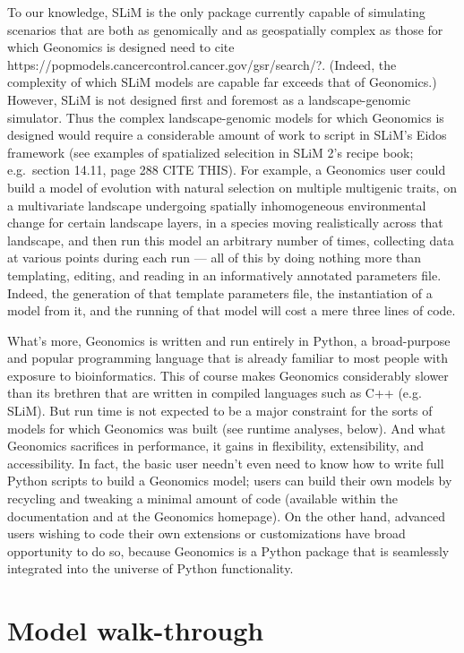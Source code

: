 ﻿\documentclass{article}
\begin{document}
To our knowledge, SLiM is the only package currently capable of simulating scenarios
that are both as genomically and as geospatially complex as those for which Geonomics is designed
{\large need to cite https://popmodels.cancercontrol.cancer.gov/gsr/search/?}.
(Indeed, the complexity of which SLiM models are capable far exceeds that of Geonomics.)
However, SLiM is not designed first and foremost as a landscape-genomic simulator.
Thus the complex landscape-genomic models for which Geonomics is designed would require
a considerable amount of work to script in SLiM's Eidos framework
(see examples of spatialized selecition in SLiM 2's recipe book;
e.g.\ section 14.11, page 288 {\large CITE THIS}).
For example, a Geonomics user could build a model of evolution with natural selection
on multiple multigenic traits, on a multivariate landscape undergoing spatially inhomogeneous
environmental change for certain landscape layers, in a species moving realistically across that landscape,
and then run this model an arbitrary number of times, collecting data at various points during each
run --- all of this by doing nothing more than templating, editing,
and reading in an informatively annotated parameters file.
Indeed, the generation of that template parameters file, the instantiation of a model from it,
and the running of that model will cost a mere three lines of code.

What's more, Geonomics is written and run entirely in Python, a broad-purpose and popular
programming language that is already familiar to most people with exposure to bioinformatics.
This of course makes Geonomics considerably slower than its brethren that are
written in compiled languages such as C++ (e.g. SLiM). 
But run time is not expected to be a major constraint for the sorts of models
for which Geonomics was built (see runtime analyses, below). 
And what Geonomics sacrifices in performance, it gains in flexibility, extensibility, and accessibility.
In fact, the basic user needn't even need to know how to write full Python scripts to 
build a Geonomics model; users can build their own models by recycling and tweaking
a minimal amount of code (available within the documentation and at the Geonomics homepage).
On the other hand, advanced users wishing to code their own extensions or customizations
have broad opportunity to do so, because Geonomics is a Python package that is seamlessly
integrated into the universe of Python functionality.


\section{Model walk-through}
\end{document}
